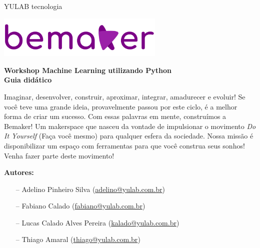 \documentclass[a4paper,12pt]{report}
\begin{document}
\pagebreak
\thispagestyle{empty}

\begin{center}
  \LARGE{YULAB tecnologia}\\
\end{center}

\begin{center}
	\includegraphics[keepaspectratio, width=8cm]{BeMaker_Marca_04.pdf}
\end{center}

\vspace{1cm}
\begin{center}
  \Huge{\textbf{Workshop Machine Learning utilizando Python}}\\
  \Large{\textbf{Guia didático}}
\end{center}

\vspace{3cm}
\begin{flushright}
  \begin{minipage}[t]{0.750\textwidth}
Imaginar, desenvolver, construir, aproximar, integrar, amadurecer e evoluir!
Se você teve uma grande ideia, provavelmente passou por este ciclo, é a melhor forma de criar um sucesso. Com essas palavras em mente, construímos a Bemaker! Um makerspace
que nasceu da vontade de impulsionar o movimento \textit{Do It Yourself} (Faça você mesmo) para qualquer esfera da sociedade.
Nossa missão é disponibilizar um espaço com ferramentas para que você construa seus sonhos!
Venha fazer parte deste movimento!
  \end{minipage}
\end{flushright}

\vspace{2cm}
\begin{large}
  \textbf{Autores:}
\end{large}
\begin{itemize} [noitemsep,topsep=0pt]
 \item[--] Adelino Pinheiro Silva (\href{mailto:adelino@yulab.com.br}{adelino@yulab.com.br})
 \item[--] Fabiano Calado (\href{mailto:fabiano@yulab.com.br}{fabiano@yulab.com.br})
 \item[--] Lucas Calado Alves Pereira (\href{mailto:kalado@yulab.com.br}{kalado@yulab.com.br})
 \item[--] Thiago Amaral (\href{mailto:thiago@yulab.com.br}{thiago@yulab.com.br})
\end{itemize}
\end{document}

